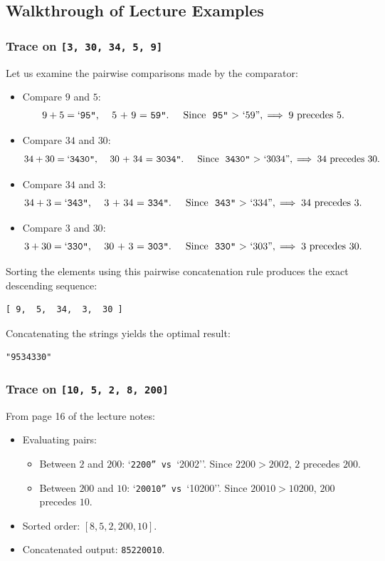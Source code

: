 \documentclass[10pt,journal,compsoc,onecolumn]{IEEEtran}
\begin{document}
\subsection{Walkthrough of Lecture Examples}

\subsubsection{Trace on \texttt{[3, 30, 34, 5, 9]}}
Let us examine the pairwise comparisons made by the comparator:
\begin{itemize}
    \item Compare $9$ and $5$:
    \[
    9 + 5 = \text{`\texttt{95''}, \quad 5 + 9 = \text{}\texttt{59''}. \quad \text{Since } \text{}\texttt{95''} > \text{}`59''}, \implies 9 \text{ precedes } 5.
    \]
    \item Compare $34$ and $30$:
    \[
    34 + 30 = \text{`\texttt{3430''}, \quad 30 + 34 = \text{}\texttt{3034''}. \quad \text{Since } \text{}\texttt{3430''} > \text{}`3034''}, \implies 34 \text{ precedes } 30.
    \]
    \item Compare $34$ and $3$:
    \[
    34 + 3 = \text{`\texttt{343''}, \quad 3 + 34 = \text{}\texttt{334''}. \quad \text{Since } \text{}\texttt{343''} > \text{}`334''}, \implies 34 \text{ precedes } 3.
    \]
    \item Compare $3$ and $30$:
    \[
    3 + 30 = \text{`\texttt{330''}, \quad 30 + 3 = \text{}\texttt{303''}. \quad \text{Since } \text{}\texttt{330''} > \text{}`303''}, \implies 3 \text{ precedes } 30.
    \]
\end{itemize}
Sorting the elements using this pairwise concatenation rule produces the exact descending sequence:
\begin{verbatim}
[ 9,  5,  34,  3,  30 ]
\end{verbatim}
Concatenating the strings yields the optimal result:
\begin{verbatim}
"9534330"
\end{verbatim}

\subsubsection{Trace on \texttt{[10, 5, 2, 8, 200]}}
From page 16 of the lecture notes:
\begin{itemize}
    \item Evaluating pairs:
    \begin{itemize}
        \item Between $2$ and $200$: `\texttt{2200'' vs }`2002''. Since $2200 > 2002$, $2$ precedes $200$.
        \item Between $200$ and $10$: `\texttt{20010'' vs }`10200''. Since $20010 > 10200$, $200$ precedes $10$.
    \end{itemize}
    \item Sorted order: $[8, 5, 2, 200, 10]$.
    \item Concatenated output: \texttt{85220010}.
\end{itemize}
\end{document}
